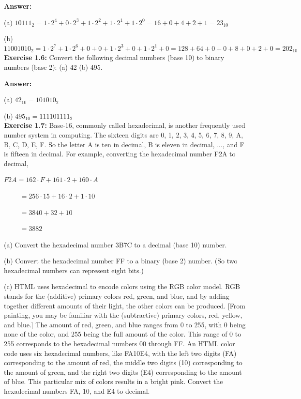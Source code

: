\documentclass[12pt]{article}
\begin{document}
\textbf{Answer:}

(a) \(10111_{2} = 1 \cdot 2^{4} + 0 \cdot 2^{3} + 1 \cdot 2^{2} + 1 \cdot 2^{1} + 1 \cdot 2^{0} = 16 + 0 + 4 + 2 + 1 = 23_{10} \)

(b) \(11001010_{2} = 1 \cdot 2^{7} + 1 \cdot 2^{6} + 0 + 0 + 1 \cdot 2^{3} + 0 + 1 \cdot 2^{1} + 0 = 128 + 64 + 0 + 0 + 8 + 0 + 2 + 0 = 202_{10}\)\\

\textbf{Exercise 1.6:} Convert the following decimal numbers (base 10) to binary numbers (base 2): (a) 42 (b) 495.

\textbf{Answer:}

(a) \(42_{10} = 101010_{2}\)

(b) \(495_{10} = 111101111_{2}\)\\

\textbf{Exercise 1.7:} Base-16, commonly called hexadecimal, is another frequently used number system in computing. The sixteen digits are 0, 1, 2, 3, 4, 5, 6, 7, 8, 9, A, B, C, D, E, F. So the letter A is ten in decimal, B is eleven in decimal, ..., and F is fifteen in decimal. For example, converting the hexadecimal number F2A to decimal,

\(F2A = 162 \cdot F + 161 \cdot 2 + 160 \cdot A\)

\(\quad\quad\,\,= 256 \cdot 15 + 16 \cdot 2 + 1 \cdot 10\)

\(\quad\quad\,\,= 3840 + 32 + 10\)

\(\quad\quad\,\,= 3882\)

(a) Convert the hexadecimal number 3B7C to a decimal (base 10) number.

(b) Convert the hexadecimal number FF to a binary (base 2) number. (So two hexadecimal numbers can represent eight bits.)

(c) HTML uses hexadecimal to encode colors using the RGB color model. RGB stands for the (additive) primary colors red, green, and blue, and by adding together different amounts of their light, the other colors can be produced. [From painting, you may be familiar with the (subtractive) primary colors, red, yellow, and blue.] The amount of red, green, and blue ranges from 0 to 255, with 0 being none of the color, and 255 being the full amount of the color. This range of 0 to 255 corresponds to the hexadecimal numbers 00 through FF. An HTML color code uses six hexadecimal numbers, like FA10E4, with the left two digits (FA) corresponding to the amount of red, the middle two digits (10) corresponding to the amount of green, and the right two digits (E4) corresponding to the amount of blue. This particular mix of colors results in a bright pink. Convert the hexadecimal numbers FA, 10, and E4 to decimal.
\end{document}
